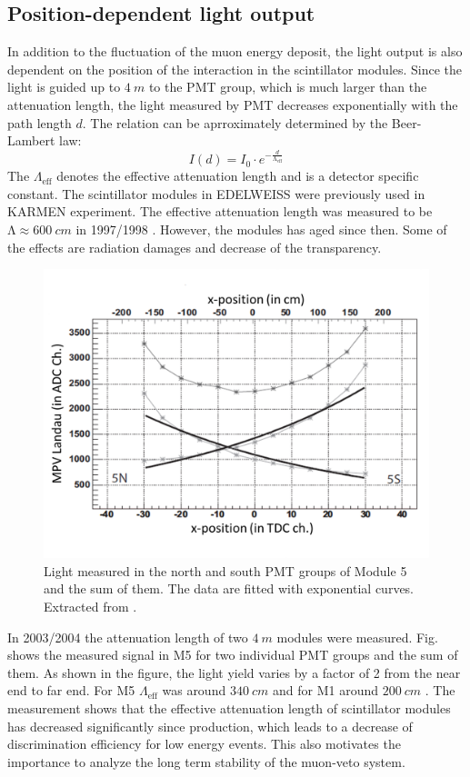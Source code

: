 \subsection{Position-dependent light output}
In addition to the fluctuation of the muon energy deposit, the light output is also dependent on the position of the interaction in the scintillator modules. Since the light is guided up to $\SI{4}{m}$ to the PMT group, which is much larger than the attenuation length, the light measured by PMT decreases exponentially with the path length $d$. The relation can be aprroximately determined by the Beer-Lambert law:
\begin{equation}
  I(d)=I_{0}\cdot e^{-\frac{d}{\mathrm{\Lambda}_{\mathrm{eff}}}}
\end{equation}
The $\Lambda_{\mathrm{eff}}$ denotes the effective attenuation length and is a detector specific constant.
The scintillator modules in EDELWEISS were previously used in KARMEN experiment. The effective attenuation length was measured to be $\mathrm{\Lambda} \approx \SI{600}{cm}$ in 1997/1998 \cite{Rei98}. However, the modules has aged since then. Some of the effects are radiation damages and decrease of the transparency.

\begin{figure}[ht!]
  \centering
  \includegraphics[width=0.6\textwidth{}]{./fig/pos-dependent.png}
  \caption{Light measured in the north and south PMT groups of Module 5 and the sum of them. The data are fitted with exponential curves. Extracted from \cite{Hab04}.}
  \label{fig:pos-dependent}
\end{figure}

In 2003/2004 the attenuation length of two $\SI{4}{m}$ modules were measured. Fig. shows the measured signal in M5 for two individual PMT groups and the sum of them. As shown in the figure, the light yield varies by a factor of 2 from the near end to far end.
For M5 $\Lambda_{\mathrm{eff}}$ was around $\SI{340}{cm}$ and for M1 around $\SI{200}{cm}$ \cite{Hab04}. The measurement shows that the effective attenuation length of scintillator modules has decreased significantly since production, which leads to a decrease of discrimination efficiency for low energy events. This also motivates the importance to analyze the long term stability of the muon-veto system.


